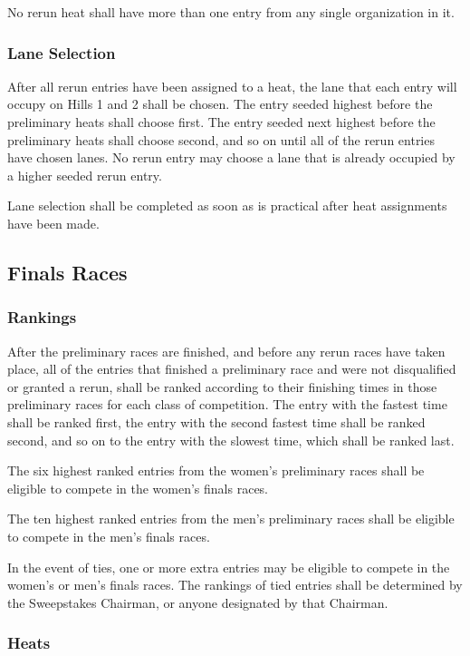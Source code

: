 	No rerun heat shall have more than one entry from any single organization in
	it.

\subsubsection{Lane Selection}
	
	After all rerun entries have been assigned to a heat, the lane that each entry
	will occupy on Hills 1 and 2 shall be chosen. The entry seeded highest before
	the preliminary heats shall choose first. The entry seeded next highest before
	the preliminary heats shall choose second, and so on until all of the rerun
	entries have chosen lanes. No rerun entry may choose a lane that is already
	occupied by a higher seeded rerun entry.

	Lane selection shall be completed as soon as is practical after heat
	assignments have been made.

\subsection{Finals Races}

\subsubsection{Rankings}

	After the preliminary races are finished, and before any rerun races have taken
	place, all of the entries that finished a preliminary race and were not
	disqualified or granted a rerun, shall be ranked according to their finishing
	times in those preliminary races for each class of competition. The entry with
	the fastest time shall be ranked first, the entry with the second fastest time
	shall be ranked second, and so on to the entry with the slowest time, which
	shall be ranked last.

	The six highest ranked entries from the women's preliminary races shall be
	eligible to compete in the women's finals races.

	The ten highest ranked entries from the men's preliminary races shall be
	eligible to compete in the men's finals races.

	In the event of ties, one or more extra entries may be eligible to compete in
	the women's or men's finals races. The rankings of tied entries shall be
	determined by the Sweepstakes Chairman, or anyone designated by that Chairman.

\subsubsection{Heats}

